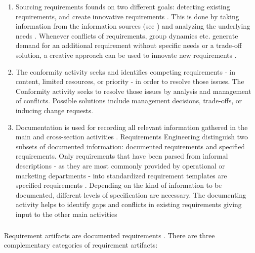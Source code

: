 \begin{enumerate}
    \item Sourcing requirements founds on two different goals: detecting existing requirements, and create innovative requirements \parencite[cf.][318, 321]{Pohl.2007}. This is done by taking information from the information sources (see ) and analyzing the underlying needs \parencite[cf.][75-76]{Sommerville.2000}. Whenever conflicts of requirements, group dynamics etc. generate demand for an additional requirement without specific needs or a trade-off solution, a creative approach can be used to innovate new requirements \parencite[cf.][94]{Lauesen.2008}. 
    \item The conformity activity seeks and identifies competing requirements - in content, limited resources, or priority - in order to resolve those issues. The Conformity activity seeks to resolve those issues by analysis and management of conflicts. Possible solutions include management decisions, trade-offs, or inducing change requests. \parencite[cf.][393]{Pohl.2007}
    \item{Documentation} is used for recording all relevant information gathered in the main and cross-section activities \parencite[cf.][217]{Pohl.2007}. Requirements Engineering distinguish two subsets of documented information: documented requirements and specified requirements. Only requirements that have been parsed from informal descriptions - as they are most commonly provided by operational or marketing departments - into standardized requirement templates are specified requirements \parencite[cf.][101]{Ebert.2014}. Depending on the kind of information to be documented, different levels of specification are necessary. The documenting activity helps to identify gaps and conflicts in existing requirements giving input to the other main activities \parencite[212]{Pohl.2007}
\end{enumerate}

\subparagraph{} Requirement artifacts are documented requirements \parencite[85]{Pohl.2007}. There are three complementary categories of requirement artifacts: 

